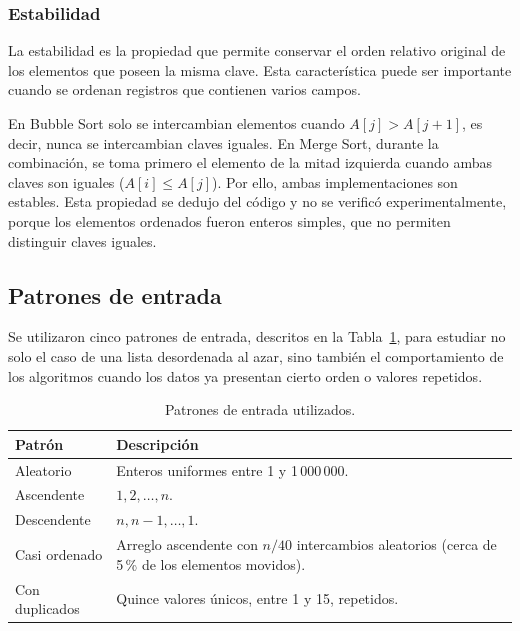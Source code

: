 \documentclass[12pt,a4paper,twocolumn]{article}
\begin{document}
\subsubsection{Estabilidad}
 
La estabilidad es la propiedad que permite conservar el orden
relativo original de los elementos que poseen la misma clave.
Esta característica puede ser importante cuando se ordenan
registros que contienen varios campos.
 
En Bubble Sort solo se intercambian elementos cuando
$A[j] > A[j+1]$, es decir, nunca se intercambian claves iguales.
En Merge Sort, durante la combinación, se toma primero el elemento
de la mitad izquierda cuando ambas claves son iguales
($A[i] \leq A[j]$). Por ello, ambas implementaciones son estables.
Esta propiedad se dedujo del código y no se verificó
experimentalmente, porque los elementos ordenados fueron enteros
simples, que no permiten distinguir claves iguales.
 
\subsection{Patrones de entrada}
 
Se utilizaron cinco patrones de entrada, descritos en la
Tabla~\ref{tab:patrones}, para estudiar no solo el caso de una lista
desordenada al azar, sino también el comportamiento de los
algoritmos cuando los datos ya presentan cierto orden o valores
repetidos.
 
\begin{table}[t]
\centering
\caption{Patrones de entrada utilizados.}\label{tab:patrones}
\small
\setlength{\tabcolsep}{3pt}
\begin{tabularx}{\columnwidth}{@{}>{\raggedright\arraybackslash}p{2.2cm}>{\raggedright\arraybackslash}X@{}}
\toprule
\textbf{Patrón} & \textbf{Descripción} \\
\midrule
Aleatorio & Enteros uniformes entre 1 y 1\,000\,000. \\
Ascendente & $1, 2, \dots, n$. \\
Descendente & $n, n-1, \dots, 1$. \\
Casi ordenado & Arreglo ascendente con $n/40$ intercambios aleatorios (cerca de 5\,\% de los elementos movidos). \\
Con duplicados & Quince valores únicos, entre 1 y 15, repetidos. \\
\bottomrule
\end{tabularx}

\end{table}
 
\end{document}
